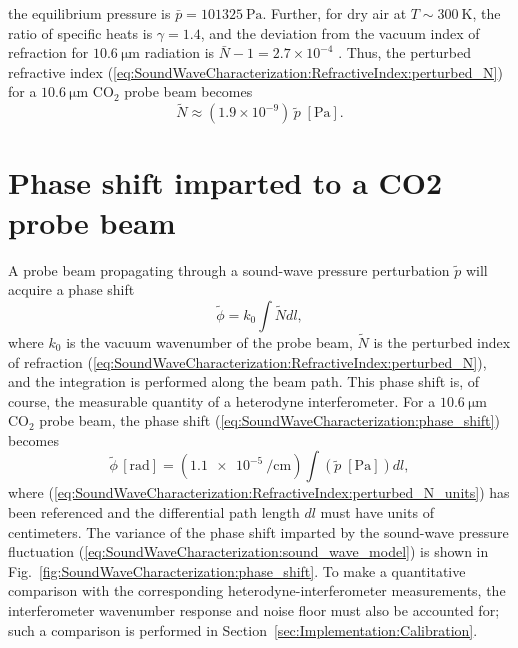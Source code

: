 the equilibrium pressure is $\bar{p} = \SI{101325}{\pascal}$.
Further, for dry air at $T \sim \SI{300}{\kelvin}$,
the ratio of specific heats is $\gamma = 1.4$, and
the deviation from the vacuum index of refraction
for $\SI{10.6}{\micro\meter}$ radiation is
$\bar{N} - 1 = 2.7 \times 10^{-4}$
\cite{marchetti_ipt06, mathar_N_IR_07, refractive_index_database}.
Thus, the perturbed refractive index
(\ref{eq:SoundWaveCharacterization:RefractiveIndex:perturbed_N})
for a $\SI{10.6}{\micro\meter}$ CO$_2$ probe beam becomes
\begin{equation}
  \tilde{N}
  \approx
  (1.9 \times 10^{-9})
  \,
  \tilde{p} \; [\text{Pa}].
  \label{eq:SoundWaveCharacterization:RefractiveIndex:perturbed_N_units}
\end{equation}


\section{Phase shift imparted to a CO2 probe beam}
\label{sec:SoundWaveCharacterization:PhaseShift}
A probe beam propagating through
a sound-wave pressure perturbation $\tilde{p}$
will acquire a phase shift
\begin{equation}
  \tilde{\phi}
  =
  k_0 \int \tilde{N} dl,
  \label{eq:SoundWaveCharacterization:phase_shift}
\end{equation}
where $k_0$ is the vacuum wavenumber of the probe beam,
$\tilde{N}$ is the perturbed index of refraction
(\ref{eq:SoundWaveCharacterization:RefractiveIndex:perturbed_N}), and
the integration is performed along the beam path.
This phase shift is, of course,
the measurable quantity of a heterodyne interferometer.
For a $\SI{10.6}{\micro\meter}$ CO$_2$ probe beam,
the phase shift (\ref{eq:SoundWaveCharacterization:phase_shift}) becomes
\begin{equation}
  \tilde{\phi} \, [\text{rad}]
  =
  (\SI{1.1e-5}{\per\centi\meter})
  \int
  (\tilde{p} \; [\text{Pa}])
  dl,
  \label{eq:SoundWaveCharacterization:phase_shift_units}
\end{equation}
where (\ref{eq:SoundWaveCharacterization:RefractiveIndex:perturbed_N_units})
has been referenced and
the differential path length $dl$ must have units of centimeters.
The variance of the phase shift imparted
by the sound-wave pressure fluctuation
(\ref{eq:SoundWaveCharacterization:sound_wave_model})
is shown in
Fig.~\ref{fig:SoundWaveCharacterization:phase_shift}.
To make a quantitative comparison
with the corresponding heterodyne-interferometer measurements,
the interferometer wavenumber response and noise floor
must also be accounted for;
such a comparison is performed in
Section~\ref{sec:Implementation:Calibration}.

